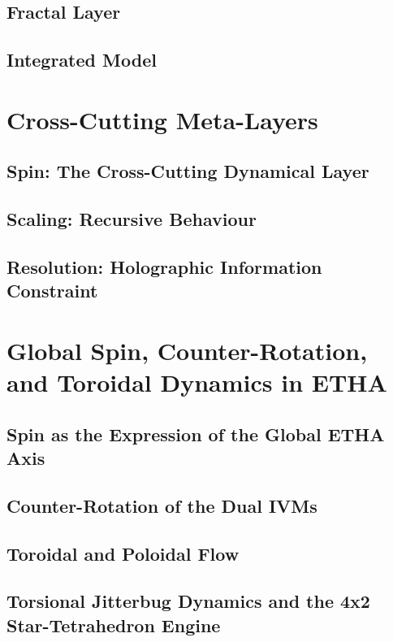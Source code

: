 \documentclass[12pt]{article}
\begin{document}
\subsection{Fractal Layer}
\subsection{Integrated Model}


\section{Cross-Cutting Meta-Layers}
\subsection{Spin: The Cross-Cutting Dynamical Layer}
\subsection{Scaling: Recursive Behaviour}
\subsection{Resolution: Holographic Information Constraint}


\section{Global Spin, Counter-Rotation, and Toroidal Dynamics in ETHA}
\subsection{Spin as the Expression of the Global ETHA Axis}
\subsection{Counter-Rotation of the Dual IVMs}
\subsection{Toroidal and Poloidal Flow}
\subsection{Torsional Jitterbug Dynamics and the 4x2 Star-Tetrahedron Engine}
\end{document}
